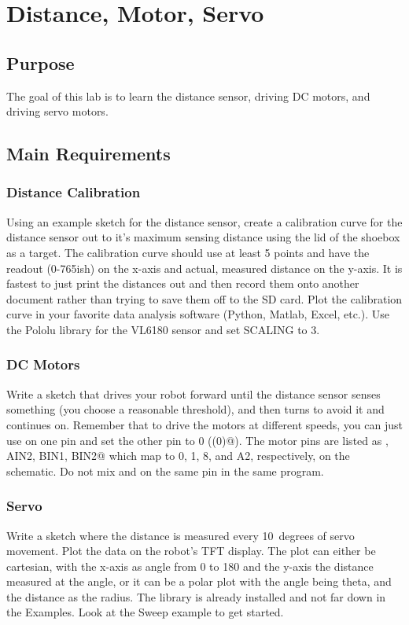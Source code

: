 \chapter{Distance, Motor, Servo}

\section{Purpose}
The goal of this lab is to learn the distance sensor, driving DC motors, and driving 
servo motors.

\section{Main Requirements}
\subsection{Distance Calibration}
Using an example sketch for the distance sensor, create a calibration curve for the distance 
sensor out to it's maximum sensing distance using the lid of the shoebox as a target. The 
calibration curve should use at least 5 points and have the readout (0-765ish) on the x-axis
and actual, measured distance on the y-axis. It is fastest to just print the distances out and 
then record them onto another document rather than trying to save them off to the SD card.
Plot the calibration curve in your favorite data analysis software (Python, Matlab, Excel, etc.). 
Use the Pololu library for the VL6180 sensor and set SCALING to 3.

\subsection{DC Motors}
Write a sketch that drives your robot forward until the distance sensor senses something 
(you choose a reasonable threshold), and then turns to avoid it and continues on. Remember
that to drive the motors at different speeds, you can just use \lstinline@analogWrite@ on 
one pin and set the other pin to 0 (\lstinline@digitalWrite(0)@). The motor pins are listed 
as , AIN2, BIN1, BIN2@ which map to 0, 1, 8, and A2, respectively, on the 
schematic. Do not mix \lstinline@analogWrite@ and \lstinline@digitalWrite@ on the same
pin in the same program.

\subsection{Servo}
Write a sketch where the distance is measured every 10~degrees of servo movement. Plot the
data on the robot's TFT display. The plot can either be cartesian, with the x-axis as angle
from 0 to 180 and the y-axis the distance measured at the angle, or it can be a polar plot 
with the angle being theta, and the distance as the radius. The \lstinline@Servo@ library 
is already installed and not far down in the Examples. Look at the Sweep example to get started.

